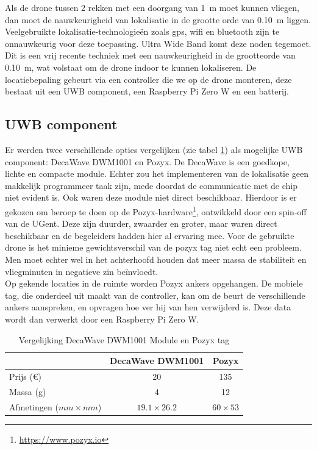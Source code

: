 Als de drone tussen 2 rekken met een doorgang van \SI{1}{\m} moet kunnen vliegen, dan moet de nauwkeurigheid van lokalisatie in de grootte orde van \SI{0.10}{\m} liggen. Veelgebruikte lokalisatie-technologie\"en zoals gps, wifi en bluetooth zijn te onnauwkeurig voor deze toepassing. Ultra Wide Band komt deze noden tegemoet. Dit is een vrij recente techniek met een nauwkeurigheid in de grootteorde van \SI{0.10}{\m}, wat volstaat om de drone indoor te kunnen lokaliseren. De locatiebepaling gebeurt via een controller die we op de drone monteren, deze bestaat uit een UWB component, een Raspberry Pi Zero W en een batterij. \\ 

\subsection{UWB component} \label{sec:uwb}
Er werden twee verschillende opties vergelijken (zie tabel \ref{tab:decavspozyx}) als mogelijke UWB component: DecaWave DWM1001 en Pozyx. De DecaWave is een goedkope, lichte en compacte module. Echter zou het implementeren van de lokalisatie geen makkelijk programmeer taak zijn, mede doordat de communicatie met de chip niet evident is. Ook waren deze module niet direct beschikbaar. Hierdoor is er gekozen om beroep te doen op de Pozyx-hardware\footnote{\url{https://www.pozyx.io}}, ontwikkeld door een spin-off van de UGent. Deze zijn duurder, zwaarder en groter, maar waren direct beschikbaar en de begeleiders hadden hier al ervaring mee. Voor de gebruikte drone is het minieme gewichtsverschil van de pozyx tag niet echt een probleem. Men moet echter wel in het achterhoofd houden dat meer massa de stabiliteit en vliegminuten in negatieve zin be\"invloedt.\\

Op gekende locaties in de ruimte worden Pozyx ankers opgehangen. De mobiele tag, die onderdeel uit maakt van de controller, kan om de beurt de verschillende ankers aanspreken, en opvragen hoe ver hij van hen verwijderd is. Deze data wordt dan verwerkt door een Raspberry Pi Zero W. \\

\begin{table}[p]
	\centering
	\begin{tabular}{ | l | c | c | } \hline
		& DecaWave DWM1001 & Pozyx \\
		\hline 
		\hline
		Prijs (\euro{}) & 20 & 135 \\ 
		\hline
		Massa (g) & 4 & 12 \\ 
		\hline
		Afmetingen ($mm \times mm$) & $19.1 \times 26.2$ & $60 \times 53$ \\ 
		\hline
	\end{tabular}
	\caption[Vergelijking DecaWave DWM1001 Module en Pozyx tag]{Vergelijking DecaWave DWM1001 Module en Pozyx tag}
	\label{tab:decavspozyx}
\end{table}

